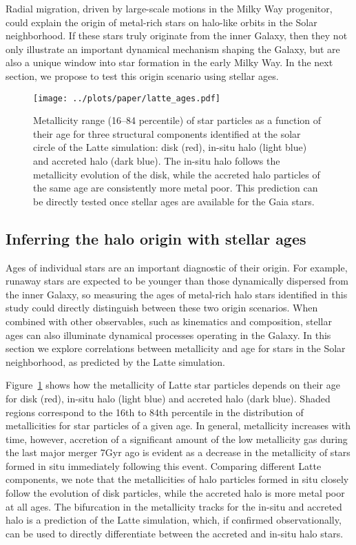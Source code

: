 \documentclass[apj, twocolappendix, numberedappendix, appendixfloats]{emulateapj}
\begin{document}
Radial migration, driven by large-scale motions in the Milky Way progenitor, could explain the origin of metal-rich stars on halo-like orbits in the Solar neighborhood.
If these stars truly originate from the inner Galaxy, then they not only illustrate an important dynamical mechanism shaping the Galaxy, but are also a unique window into star formation in the early Milky Way.
In the next section, we propose to test this origin scenario using stellar ages.

\begin{figure}
\begin{center}
\texttt{[image: ../plots/paper/latte\_ages.pdf]}
\caption{Metallicity range (16--84 percentile) of star particles as a function of their age for three structural components identified at the solar circle of the Latte simulation: disk (red), in-situ halo (light blue) and accreted halo (dark blue).
The in-situ halo follows the metallicity evolution of the disk, while the accreted halo particles of the same age are consistently more metal poor.
This prediction can be directly tested once stellar ages are available for the Gaia stars.}
\label{fig:ages}
\end{center}
\end{figure}

\subsection{Inferring the halo origin with stellar ages}
\label{sec:ages}
Ages of individual stars are an important diagnostic of their origin.
For example, runaway stars are expected to be younger than those dynamically dispersed from the inner Galaxy, so measuring the ages of metal-rich halo stars identified in this study could directly distinguish between these two origin scenarios.
When combined with other observables, such as kinematics and composition, stellar ages can also illuminate dynamical processes operating in the Galaxy.
In this section we explore correlations between metallicity and age for stars in the Solar neighborhood, as predicted by the Latte simulation.

Figure~\ref{fig:ages} shows how the metallicity of Latte star particles depends on their age for disk (red), in-situ halo (light blue) and accreted halo (dark blue).
Shaded regions correspond to the 16th to 84th percentile in the distribution of metallicities for star particles of a given age.
In general, metallicity increases with time, however, accretion of a significant amount of the low metallicity gas during the last major merger 7\;Gyr ago is evident as a decrease in the metallicity of stars formed in situ immediately following this event.
Comparing different Latte components, we note that the metallicities of halo particles formed in situ closely follow the evolution of disk particles, while the accreted halo is more metal poor at all ages.
The bifurcation in the metallicity tracks for the in-situ and accreted halo is a prediction of the Latte simulation, which, if confirmed observationally, can be used to directly differentiate between the accreted and in-situ halo stars.
\end{document}
